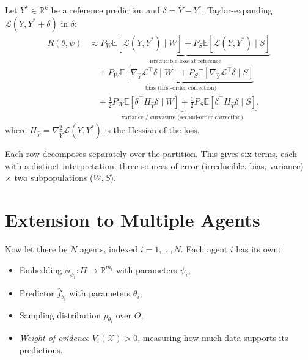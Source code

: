\begin{proposition}
\label{prop:taylor-partition}
Let $Y^* \in \mathbb{R}^k$ be a reference prediction and $\delta = \hat{Y} - Y^*$. Taylor-expanding $\mathcal{L}(Y, Y^* + \delta)$ in $\delta$:
\begin{equation}
\label{eq:risk-taylor}
\boxed{
\begin{aligned}
    R(\theta, \psi) &\approx \underbrace{P_W \mathbb{E}[\mathcal{L}(Y, Y^*) \mid W] + P_S \mathbb{E}[\mathcal{L}(Y, Y^*) \mid S]}_{\text{irreducible loss at reference}} \\
    &\quad + \underbrace{P_W \mathbb{E}[\nabla_{\hat{Y}} \mathcal{L}^\top \delta \mid W] + P_S \mathbb{E}[\nabla_{\hat{Y}} \mathcal{L}^\top \delta \mid S]}_{\text{bias (first-order correction)}} \\
    &\quad + \underbrace{\tfrac{1}{2} P_W \mathbb{E}[\delta^\top H_{\hat{Y}} \delta \mid W] + \tfrac{1}{2} P_S \mathbb{E}[\delta^\top H_{\hat{Y}} \delta \mid S]}_{\text{variance / curvature (second-order correction)}},
\end{aligned}
}
\end{equation}
where $H_{\hat{Y}} = \nabla^2_{\hat{Y}} \mathcal{L}(Y, Y^*)$ is the Hessian of the loss.
\end{proposition}

Each row decomposes separately over the partition. This gives six terms, each with a distinct interpretation: three sources of error (irreducible, bias, variance) $\times$ two subpopulations ($W, S$).


\section{Extension to Multiple Agents}
\label{sec:multi-agent-framework}

Now let there be $N$ agents, indexed $i = 1, \ldots, N$. Each agent $i$ has its own:
\begin{itemize}
    \item Embedding $\phi_{\psi_i}: \Pi \to \mathbb{R}^{m_i}$ with parameters $\psi_i$,
    \item Predictor $\hat{f}_{\theta_i}$ with parameters $\theta_i$,
    \item Sampling distribution $p_{\theta_i}$ over $O$,
    \item \emph{Weight of evidence} $V_i(\mathcal{X}) > 0$, measuring how much data supports its predictions.
\end{itemize}

